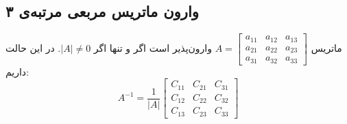 \subsection{وارون ماتریس مربعی مرتبه‌ی ۳}

\begin{theorem}
	ماتریس
	$A=
	\begin{bmatrix}
		a_{11} & a_{12} & a_{13} \\
		a_{21} & a_{22} & a_{23} \\
		a_{31} & a_{32} & a_{33}
	\end{bmatrix}$
	وارون‌پذیر است اگر و تنها اگر
	$|A| \neq 0$.
	در این حالت داریم:
	\[
	A^{-1} = \frac{1}{|A|}
	\begin{bmatrix}
		C_{11} & C_{21} & C_{31} \\
		C_{12} & C_{22} & C_{32} \\
		C_{13} & C_{23} & C_{33}
	\end{bmatrix}
	\]
\end{theorem}

